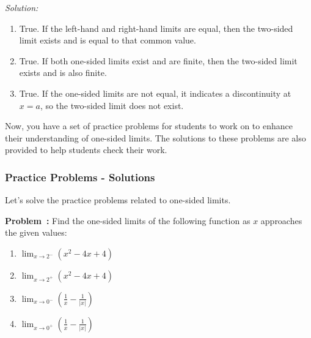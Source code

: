 \documentclass[a4paper,12pt]{book}
\newcounter{problem}
\newenvironment{problem}[1][\theproblem]
{\refstepcounter{problem}\par\medskip\noindent\textbf{Problem~#1:} \rmfamily}{\medskip}
\newenvironment{solution}[1][]
{\par\noindent\textit{Solution:} \rmfamily}{\medskip}
\begin{document}
\begin{solution}
\begin{enumerate}[label=(\alph*)]
  \item True. If the left-hand and right-hand limits are equal, then the two-sided limit exists and is equal to that common value.
  \item True. If both one-sided limits exist and are finite, then the two-sided limit exists and is also finite.
  \item True. If the one-sided limits are not equal, it indicates a discontinuity at \( x = a \), so the two-sided limit does not exist.
\end{enumerate}
\end{solution}

Now, you have a set of practice problems for students to work on to enhance their understanding of one-sided limits. The solutions to these problems are also provided to help students check their work.

\subsubsection*{Practice Problems - Solutions}

Let's solve the practice problems related to one-sided limits.

\begin{problem}
Find the one-sided limits of the following function as \( x \) approaches the given values:
\begin{enumerate}[label=(\alph*)]
  \item \( \lim_{{x \to 2^-}} (x^2 - 4x + 4) \)
  \item \( \lim_{{x \to 2^+}} (x^2 - 4x + 4) \)
  \item \( \lim_{{x \to 0^-}} \left(\frac{1}{x} - \frac{1}{|x|}\right) \)
  \item \( \lim_{{x \to 0^+}} \left(\frac{1}{x} - \frac{1}{|x|}\right) \)
\end{enumerate}
\end{problem}
\end{document}
